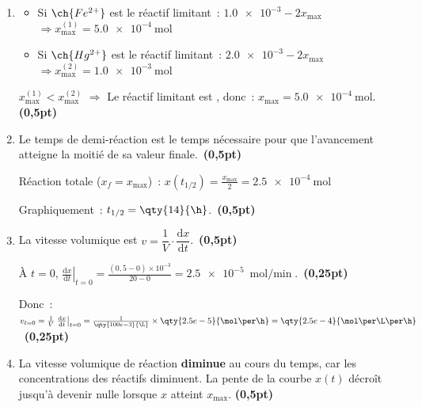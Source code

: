 \begin{enumerate}
\begin{minipage}{\linewidth}
\begin{table}[H]
\begin{tabularx}{\textwidth}{|p{2.2cm}|
                  >{\centering\arraybackslash}p{2.6cm}|C|C|
                  >{\centering\arraybackslash}p{1.7cm}|
                  >{\centering\arraybackslash}p{1.7cm}|}
              \end{tabularx}
          \end{table}
          \end{minipage}
          \textbf{(1pt)}
    \item 
          \begin{itemize}
              \item Si $\ch{Fe^{2+}}$ est le réactif limitant~:
                    $\num{1.0e-3}-2x_{\max}$
                    $\Rightarrow x_{\max}^{(1)}=\qty{5.0e-4}{\mol}$  
              \item Si $\ch{Hg^{2+}}$ est le réactif limitant~:
                    $\num{2.0e-3}-2x_{\max}$
                    $\Rightarrow x^{(2)}_{\max}=\qty{1.0e-3}{\mol}$  
          \end{itemize}
          $x^{(1)}_{\max}<x^{(2)}_{\max}$ $\Rightarrow$
          Le réactif limitant est , donc~:
          $x_{\max}=\qty{5.0e-4}{\mol}$. \textbf{(0,5pt)}
        \item Le temps de demi-réaction est le temps nécessaire pour que
              l'avancement atteigne la moitié de sa valeur
              finale.~\textbf{(0,5pt)}

              Réaction totale ($x_{f}=x_{\max}$)~:
              $x(t_{1/2})=\frac{x_{\max}}{2}=\qty{2.5e-4}{\mol}$

              Graphiquement~: $t_{1/2}=\qty{14}{\h}$.~\textbf{(0,5pt)}
        \item La vitesse volumique est
              $v=\dfrac{1}{V}\cdot\dfrac{\mathrm{d}x}{\mathrm{d}t}$.~\textbf{(0,5pt)}

              À $t=0$,
              $\left.\frac{\mathrm{d}x}{\mathrm{d}t}\right|_{t=0}=
              \frac{(0,5-0)\times 10^{-3}}{20-0}=
              \qty{2.5e-5}{\mol\per\min}$.~\textbf{(0,25pt)}

              Donc~:
              $v_{t=0}=\frac{1}{V}
              \left.\frac{\mathrm{d}x}{\mathrm{d}t}\right|_{t=0}=
              \frac{1}{\qty{100e-3}{\L}}\times\qty{2.5e-5}{\mol\per\h}=
              \qty{2.5e-4}{\mol\per\L\per\h}$~\textbf{(0,25pt)}
        \item La vitesse volumique de réaction \textbf{diminue} au cours du
              temps, car les concentrations des réactifs diminuent. 
              La pente de la courbe $x(t)$ décroît jusqu'à devenir nulle lorsque
              $x$ atteint $x_{\max}$.
              \textbf{(0,5pt)}
    \end{enumerate}




